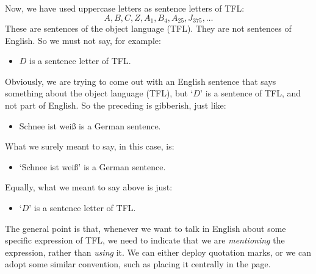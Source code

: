 Now, we have used uppercase letters as sentence letters of TFL:
	$$A, B, C, Z, A_1, B_4, A_{25}, J_{375},\ldots$$
These are sentences of the object language (TFL). They are not sentences of English. So we must not say, for example:
	\begin{itemize}
		\item $D$ is a sentence letter of TFL.
	\end{itemize}
Obviously, we are trying to come out with an English sentence that says something about the object language (TFL), but `$D$' is a sentence of TFL, and not part of English. So the preceding is gibberish, just like:
	\begin{itemize}
		\item \foreignlanguage{german}{Schnee ist weiß} is a German sentence.
	\end{itemize}
What we surely meant to say, in this case, is:
	\begin{itemize}
		\item `\foreignlanguage{german}{Schnee ist weiß}' is a German sentence.
	\end{itemize}
Equally, what we meant to say above is just:
	\begin{itemize}
		\item `$D$' is a sentence letter of TFL.
	\end{itemize}
The general point is that, whenever we want to talk in English about some specific expression of TFL, we need to indicate that we are \emph{mentioning} the expression, rather than \emph{using} it. We can either deploy quotation marks, or we can adopt some similar convention, such as  placing it centrally in the page.



